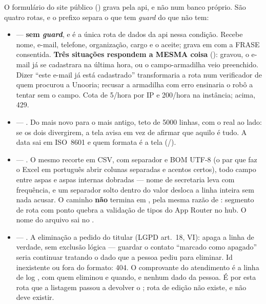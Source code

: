 O formulário do site público (\cd{/}) grava pela api, e não num banco próprio.
São quatro rotas, e o prefixo separa o que tem \emph{guard} do que não tem:

\begin{itemize}
  \item {} --- \textbf{sem \emph{guard}},
    e é a única rota de dados da api nessa condição. Recebe nome, e-mail,
    telefone, organização, cargo e o aceite; grava em 
    com a FRASE consentida. \textbf{Três situações respondem a MESMA coisa}
    (): gravou, o e-mail já se cadastrara na última
    hora, ou o campo-armadilha veio preenchido. Dizer \enquote{este e-mail já
    está cadastrado} transformaria a rota num verificador de quem procurou a
    Unooria; recusar a armadilha com erro ensinaria o robô a tentar sem o campo.
    Cota de \num{5}/hora por IP e \num{200}/hora na instância; acima, \num{429}.
  \item {} --- . Do mais novo para o
    mais antigo, teto de \num{5000} linhas, com o  real ao lado: se os
    dois divergirem, a tela avisa em vez de afirmar que aquilo é tudo. A data
    sai em ISO~8601 e quem formata é a tela (/).
  \item {} --- . O mesmo
    recorte em CSV, com separador \cd{;} e BOM UTF-8 (o par que faz o Excel em
    português abrir colunas separadas e acentos certos), todo campo entre aspas
    e aspas internas dobradas --- nome de secretaria leva \cd{;} com frequência,
    e um separador solto dentro do valor desloca a linha inteira sem nada
    acusar. O caminho \textbf{não} termina em , pela mesma razão de
    : segmento de rota com ponto quebra a
    validação de tipos do App Router no hub. O nome do arquivo sai no
    .
  \item {} --- . A
    eliminação a pedido do titular (LGPD art.~18, VI): apaga a linha de
    verdade, sem exclusão lógica --- guardar o contato \enquote{marcado como
    apagado} seria continuar tratando o dado que a pessoa pediu para eliminar.
    Id inexistente ou fora do formato: \num{404}. O comprovante do atendimento
    é a linha de log , com quem eliminou e
    quando, e nenhum dado da pessoa. É por esta rota que a listagem passou a
    devolver o ; rota de edição não existe, e não deve existir.
\end{itemize}

